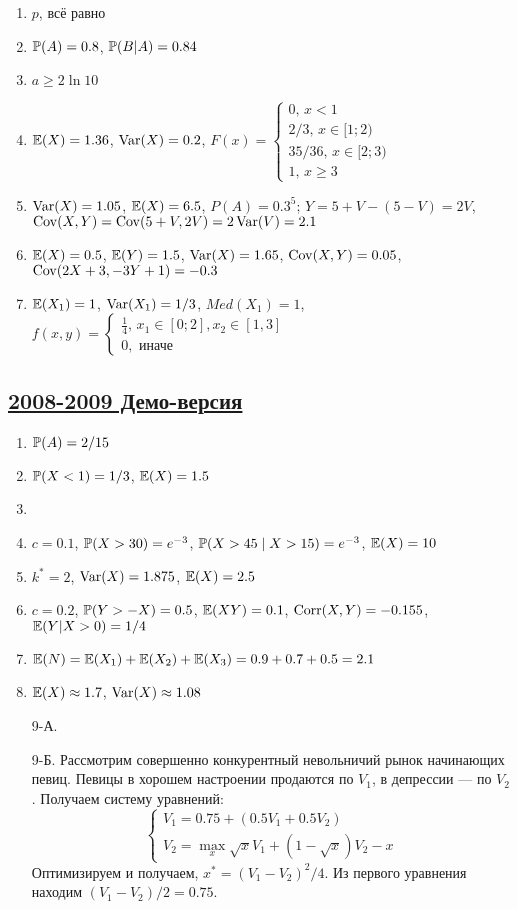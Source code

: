 \begin{enumerate}
\item $p$, всё равно
\item $\P(A) = 0.8$, $\P(B|A) = 0.84$
\item $a \geq 2\ln 10$
\item $\E(X) = 1.36$, $\Var(X) = 0.2$, $F(x) = \begin{cases}
0, \, x<1 \\
2/3, \, x\in [1;2) \\
35/36, \, x\in[2;3) \\
1, \, x\geq 3
\end{cases}$
\item $\Var(X) = 1.05$, $\E(X) = 6.5$, $P(A) = 0.3^5$; $Y = 5 + V - (5 - V) = 2V$,
$\Cov(X, Y) = \Cov(5 + V, 2V) = 2\Var(V) = 2.1$
\item $\E(X) = 0.5$, $\E(Y) = 1.5$, $\Var(X) = 1.65$, $\Cov(X, Y) = 0.05$,
$\Cov(2X + 3, -3Y + 1) = -0.3$
\item $\E(X_1) = 1$, $\Var(X_1) = 1/3$, $Med(X_1) = 1$, $f(x,y) = \begin{cases}
\frac{1}{4}, \, x_1\in [0;2], x_2\in [1,3] \\
0, \text{ иначе}
\end{cases}$
\end{enumerate}



\subsection[2008-2009 Демо-версия]{\hyperref[sec:kr_01_2008_2009_demo]{2008-2009 Демо-версия}}
\label{sec:sol_kr_01_2008_2009_demo}

\begin{enumerate}
\item $\P(A) = 2/15$
\item $\P(X < 1) = 1/3$, $\E(X) = 1.5$
\item
\item $c = 0.1$, $\P(X > 30) = e^{-3}$, $\P(X > 45 \mid X > 15) = e^{-3}$, $\E(X) = 10$
\item $k^*=2$, $\Var(X) = 1.875$, $\E(X) = 2.5$
\item $c = 0.2$, $\P(Y > -X) = 0.5$, $\E(XY) = 0.1$, $\Corr(X, Y) = -0.155$, $\E(Y| X > 0) = 1/4$
\item $\E(N)=\E(X_1)+\E(X_2)+\E(X_3)=0.9+0.7+0.5=2.1$
\item $\E(X) \approx 1.7$, $\Var(X) \approx 1.08$
\item[9-А.]
\item[9-Б.] Рассмотрим совершенно конкурентный невольничий рынок начинающих певиц.
Певицы в хорошем настроении продаются по $V_1$, в депрессии — по $V_2$. Получаем
систему уравнений:
\[
\begin{cases}
  V_1 = 0.75 + (0.5 V_1 + 0.5 V_2) \\
  V_2 = \max_x \sqrt{x}V_1 + (1 - \sqrt{x})V_2 - x
\end{cases}
\]
Оптимизируем и получаем, $x^* = (V_1 - V_2)^2/4$. Из первого уравнения находим
$(V_1 - V_2) / 2 = 0.75$.
\end{enumerate}


